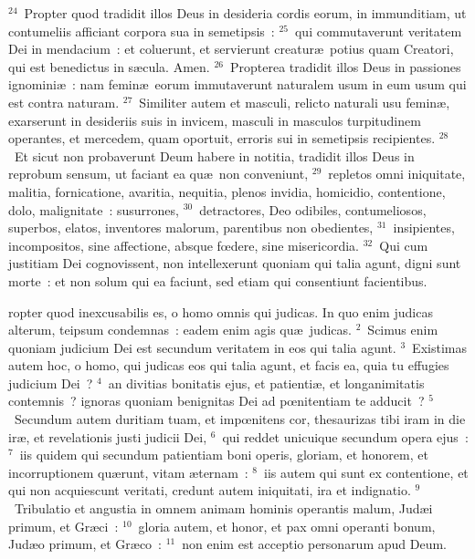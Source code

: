 ${}^{24}$~Propter quod tradidit illos Deus in desideria cordis eorum, in immunditiam, ut contumeliis afficiant corpora sua in semetipsis~:
${}^{25}$~qui commutaverunt veritatem Dei in mendacium~: et coluerunt, et servierunt creatur\ae\ potius quam Creatori, qui est benedictus in s\ae cula. Amen.
${}^{26}$~Propterea tradidit illos Deus in passiones ignomini\ae~: nam femin\ae\ eorum immutaverunt naturalem usum in eum usum qui est contra naturam.
${}^{27}$~Similiter autem et masculi, relicto naturali usu femin\ae , exarserunt in desideriis suis in invicem, masculi in masculos turpitudinem operantes, et mercedem, quam oportuit, erroris sui in semetipsis recipientes.
${}^{28}$~Et sicut non probaverunt Deum habere in notitia, tradidit illos Deus in reprobum sensum, ut faciant ea qu\ae\ non conveniunt,
${}^{29}$~repletos omni iniquitate, malitia, fornicatione, avaritia, nequitia, plenos invidia, homicidio, contentione, dolo, malignitate~: susurrones,
${}^{30}$~detractores, Deo odibiles, contumeliosos, superbos, elatos, inventores malorum, parentibus non obedientes,
${}^{31}$~insipientes, incompositos, sine affectione, absque fœdere, sine misericordia.
${}^{32}$~Qui cum justitiam Dei cognovissent, non intellexerunt quoniam qui talia agunt, digni sunt morte~: et non solum qui ea faciunt, sed etiam qui consentiunt facientibus.

\bchapter
{}ropter quod inexcusabilis es, o homo omnis qui judicas. In quo enim judicas alterum, teipsum condemnas~: eadem enim agis qu\ae\ judicas.
${}^{2}$~Scimus enim quoniam judicium Dei est secundum veritatem in eos qui talia agunt.
${}^{3}$~Existimas autem hoc, o homo, qui judicas eos qui talia agunt, et facis ea, quia tu effugies judicium Dei~?
${}^{4}$~an divitias bonitatis ejus, et patienti\ae , et longanimitatis contemnis~? ignoras quoniam benignitas Dei ad pœnitentiam te adducit~?
${}^{5}$~Secundum autem duritiam tuam, et impœnitens cor, thesaurizas tibi iram in die ir\ae , et revelationis justi judicii Dei,
${}^{6}$~qui reddet unicuique secundum opera ejus~:
${}^{7}$~iis quidem qui secundum patientiam boni operis, gloriam, et honorem, et incorruptionem qu\ae runt, vitam \ae ternam~:
${}^{8}$~iis autem qui sunt ex contentione, et qui non acquiescunt veritati, credunt autem iniquitati, ira et indignatio.
${}^{9}$~Tribulatio et angustia in omnem animam hominis operantis malum, Jud\ae i primum, et Gr\ae ci~:
${}^{10}$~gloria autem, et honor, et pax omni operanti bonum, Jud\ae o primum, et Gr\ae co~:
${}^{11}$~non enim est acceptio personarum apud Deum.



